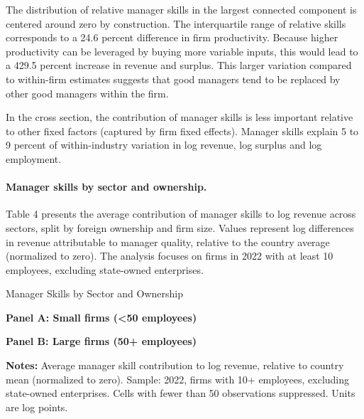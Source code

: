\documentclass[11pt,a4paper]{article}
\begin{document}
The distribution of relative manager skills in the largest connected component is centered around zero by construction. The interquartile range of relative skills corresponds to a 24.6 percent difference in firm productivity. Because higher productivity can be leveraged by buying more variable inputs, this would lead to a 429.5 percent increase in revenue and surplus. This larger variation compared to within-firm estimates suggests that good managers tend to be replaced by other good managers within the firm. 

In the cross section, the contribution of manager skills is less important relative to other fixed factors (captured by firm fixed effects). Manager skills explain 5 to 9 percent of within-industry variation in log revenue, log surplus and log employment.

\paragraph{Manager skills by sector and ownership.} Table 4 presents the average contribution of manager skills to log revenue across sectors, split by foreign ownership and firm size. Values represent log differences in revenue attributable to manager quality, relative to the country average (normalized to zero). The analysis focuses on firms in 2022 with at least 10 employees, excluding state-owned enterprises.

\begin{table}[htbp]
\centering
\caption{Manager Skills by Sector and Ownership}
\label{tab:manager_skills}
\begin{minipage}{0.45\textwidth}
\centering
\textbf{Panel A: Small firms (<50 employees)}

\end{minipage}
\hfill
\begin{minipage}{0.45\textwidth}
\centering
\textbf{Panel B: Large firms (50+ employees)}

\end{minipage}
\begin{tablenotes}[flushleft]
\footnotesize
\item\textbf{Notes:} Average manager skill contribution to log revenue, relative to country mean (normalized to zero). Sample: 2022, firms with 10+ employees, excluding state-owned enterprises. Cells with fewer than 50 observations suppressed. Units are log points.
\end{tablenotes}
\end{table}
\end{document}
